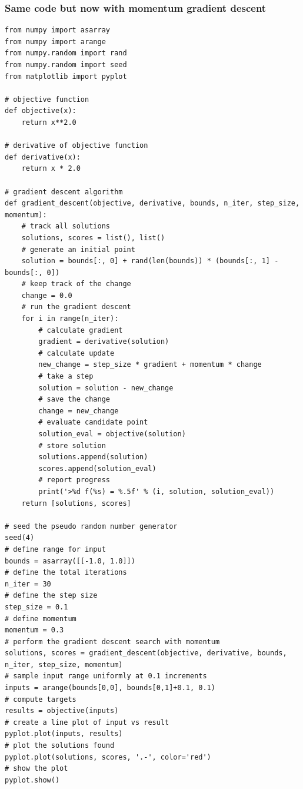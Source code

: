\documentclass{beamer}
\begin{document}
\begin{frame}
\frametitle{Same code but now with momentum gradient descent}

\begin{verbatim}
from numpy import asarray
from numpy import arange
from numpy.random import rand
from numpy.random import seed
from matplotlib import pyplot
 
# objective function
def objective(x):
	return x**2.0
 
# derivative of objective function
def derivative(x):
	return x * 2.0
 
# gradient descent algorithm
def gradient_descent(objective, derivative, bounds, n_iter, step_size, momentum):
	# track all solutions
	solutions, scores = list(), list()
	# generate an initial point
	solution = bounds[:, 0] + rand(len(bounds)) * (bounds[:, 1] - bounds[:, 0])
	# keep track of the change
	change = 0.0
	# run the gradient descent
	for i in range(n_iter):
		# calculate gradient
		gradient = derivative(solution)
		# calculate update
		new_change = step_size * gradient + momentum * change
		# take a step
		solution = solution - new_change
		# save the change
		change = new_change
		# evaluate candidate point
		solution_eval = objective(solution)
		# store solution
		solutions.append(solution)
		scores.append(solution_eval)
		# report progress
		print('>%d f(%s) = %.5f' % (i, solution, solution_eval))
	return [solutions, scores]
 
# seed the pseudo random number generator
seed(4)
# define range for input
bounds = asarray([[-1.0, 1.0]])
# define the total iterations
n_iter = 30
# define the step size
step_size = 0.1
# define momentum
momentum = 0.3
# perform the gradient descent search with momentum
solutions, scores = gradient_descent(objective, derivative, bounds, n_iter, step_size, momentum)
# sample input range uniformly at 0.1 increments
inputs = arange(bounds[0,0], bounds[0,1]+0.1, 0.1)
# compute targets
results = objective(inputs)
# create a line plot of input vs result
pyplot.plot(inputs, results)
# plot the solutions found
pyplot.plot(solutions, scores, '.-', color='red')
# show the plot
pyplot.show()

\end{verbatim}
\end{frame}
\end{document}
